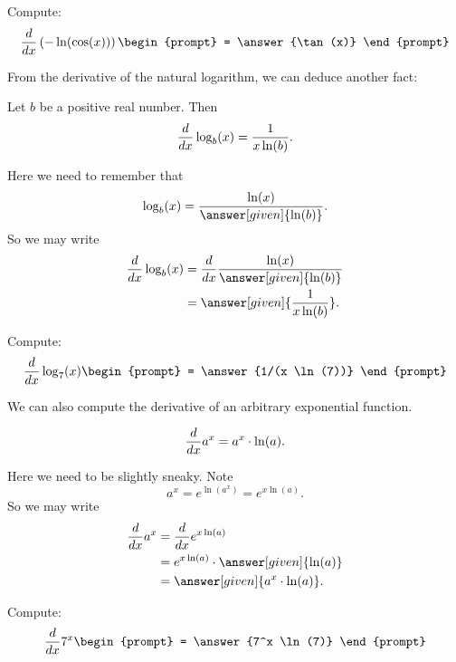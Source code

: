 \documentclass{ximera}
\begin{document}
\begin{question}
  Compute:
  \[
  \ddx \left(-\ln(\cos(x))\right)
  \begin{prompt}
    = \answer{\tan(x)}
  \end{prompt}
  \]
\end{question}



From the derivative of the natural logarithm, we can deduce another fact:

\begin{theorem}
  Let $b$ be a positive real number. Then
  \[
  \frac{d}{\mathop{}\!d x} \log_b(x) = \frac{1}{x\ln(b)}.
  \]
  \begin{explanation}
    Here we need to remember that
    \[
    \log_b(x) = \frac{\ln(x)}{\answer[given]{\ln(b)}}.
    \]
    So we may write
    \begin{align*}
      \ddx \log_b(x) &= \ddx \frac{\ln(x)}{\answer[given]{\ln(b)}}\\
      &= \answer[given]{\frac{1}{x\ln(b)}}.
    \end{align*}
  \end{explanation}
\end{theorem}

\begin{question}
  Compute:
  \[
  \ddx \log_7(x)
  \begin{prompt}
    = \answer{1/(x \ln(7))}
  \end{prompt}
  \]
\end{question}


We can also compute the derivative of an arbitrary exponential
function.

\begin{theorem}
  \[
  \frac{d}{\mathop{}\!d x} a^x = a^x\cdot \ln(a).
  \]
  \begin{explanation}
    Here we need to be slightly sneaky. Note
    \[
    a^x = e^{\ln(a^x)} = e^{x\ln(a)}.
    \]
    So we may write
    \begin{align*}
      \ddx a^x &= \ddx e^{x\ln(a)}\\
      &= e^{x\ln(a)} \cdot \answer[given]{\ln(a)}\\
      &= \answer[given]{a^x\cdot \ln(a)}.
    \end{align*}
  \end{explanation}
\end{theorem}

\begin{question}
  Compute:
  \[
  \ddx 7^x
  \begin{prompt}
    = \answer{7^x \ln(7)}
  \end{prompt}
  \]
\end{question}
\end{document}
